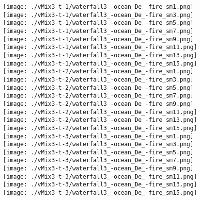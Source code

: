 \begin{figure}[ht!]
{\centering
    \texttt{[image: ./vMix3-t-1/waterfall3\_-ocean\_De\_-fire\_sm1.png]}
    \texttt{[image: ./vMix3-t-1/waterfall3\_-ocean\_De\_-fire\_sm3.png]}
    \texttt{[image: ./vMix3-t-1/waterfall3\_-ocean\_De\_-fire\_sm5.png]}
    \texttt{[image: ./vMix3-t-1/waterfall3\_-ocean\_De\_-fire\_sm7.png]}
    \texttt{[image: ./vMix3-t-1/waterfall3\_-ocean\_De\_-fire\_sm9.png]}
    \texttt{[image: ./vMix3-t-1/waterfall3\_-ocean\_De\_-fire\_sm11.png]}
    \texttt{[image: ./vMix3-t-1/waterfall3\_-ocean\_De\_-fire\_sm13.png]}
    \texttt{[image: ./vMix3-t-1/waterfall3\_-ocean\_De\_-fire\_sm15.png]} \\
\vspace{1mm}
    \texttt{[image: ./vMix3-t-2/waterfall3\_-ocean\_De\_-fire\_sm1.png]}
    \texttt{[image: ./vMix3-t-2/waterfall3\_-ocean\_De\_-fire\_sm3.png]}
    \texttt{[image: ./vMix3-t-2/waterfall3\_-ocean\_De\_-fire\_sm5.png]}
    \texttt{[image: ./vMix3-t-2/waterfall3\_-ocean\_De\_-fire\_sm7.png]}
    \texttt{[image: ./vMix3-t-2/waterfall3\_-ocean\_De\_-fire\_sm9.png]}
    \texttt{[image: ./vMix3-t-2/waterfall3\_-ocean\_De\_-fire\_sm11.png]}
    \texttt{[image: ./vMix3-t-2/waterfall3\_-ocean\_De\_-fire\_sm13.png]}
    \texttt{[image: ./vMix3-t-2/waterfall3\_-ocean\_De\_-fire\_sm15.png]} \\
\vspace{1mm}
    \texttt{[image: ./vMix3-t-3/waterfall3\_-ocean\_De\_-fire\_sm1.png]}
    \texttt{[image: ./vMix3-t-3/waterfall3\_-ocean\_De\_-fire\_sm3.png]}
    \texttt{[image: ./vMix3-t-3/waterfall3\_-ocean\_De\_-fire\_sm5.png]}
    \texttt{[image: ./vMix3-t-3/waterfall3\_-ocean\_De\_-fire\_sm7.png]}
    \texttt{[image: ./vMix3-t-3/waterfall3\_-ocean\_De\_-fire\_sm9.png]}
    \texttt{[image: ./vMix3-t-3/waterfall3\_-ocean\_De\_-fire\_sm11.png]}
    \texttt{[image: ./vMix3-t-3/waterfall3\_-ocean\_De\_-fire\_sm13.png]}
    \texttt{[image: ./vMix3-t-3/waterfall3\_-ocean\_De\_-fire\_sm15.png]} \\
\vspace{1mm}
}
\end{figure}
